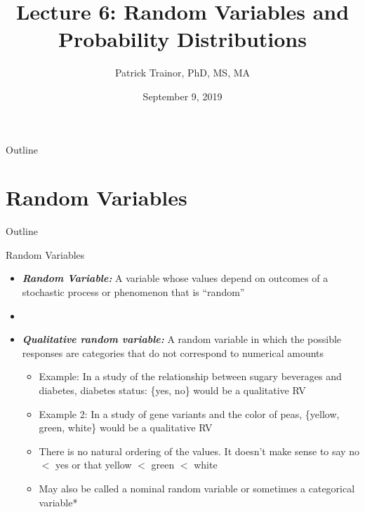 \documentclass[xcolor=dvipsnames]{beamer}
\title[Lecture 6]{Lecture 6: Random Variables and Probability Distributions}
\author[Patrick Trainor]{Patrick Trainor, PhD, MS, MA}
\institute[NMSU]{New Mexico State University}
\date{September 9, 2019}
\begin{document}
\begin{frame}
	\maketitle
\end{frame}

\begin{frame}{Outline}
	\tableofcontents[hideallsubsections]
\end{frame}

\section{Random Variables}
\begin{frame}{Outline}
	\tableofcontents[currentsection,subsectionstyle=show/shaded/hide]
\end{frame}

\begin{frame}{Random Variables}
	\begin{itemize}
		\item \textbf{\emph{Random Variable:}} A variable whose values depend on outcomes of a stochastic process or phenomenon that is ``random'' \pause
		\item[]
		\item \textbf{\emph{Qualitative random variable:}} A random variable in which the possible responses are categories that do not correspond to numerical amounts \pause
		\begin{itemize}
			\item Example: In a study of the relationship between sugary beverages and diabetes, diabetes status: \{yes, no\} would be a qualitative RV \pause
			\item Example 2: In a study of gene variants and the color of peas, \{yellow, green, white\} would be a qualitative RV \pause
			\item There is no natural ordering of the values. It doesn't make sense to say no $<$ yes or that yellow $<$ green $<$ white \pause
			\item May also be called a nominal random variable or sometimes a categorical variable*
		\end{itemize}
	\end{itemize}
\end{frame}
\end{document}
